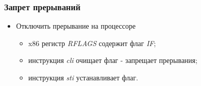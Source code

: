 \begin{frame}
\frametitle{Запрет прерываний}
\begin{itemize}
    \item<1->Отключить прерывание на процессоре
    \begin{itemize}
        \item<2-> x86 регистр \emph{RFLAGS} содержит флаг \emph{IF};
        \item<3-> инструкция \emph{cli} очищает флаг - запрещает прерывания;
        \item<3-> инструкция \emph{sti} устанавливает флаг.
    \end{itemize}
\end{itemize}
\end{frame}

